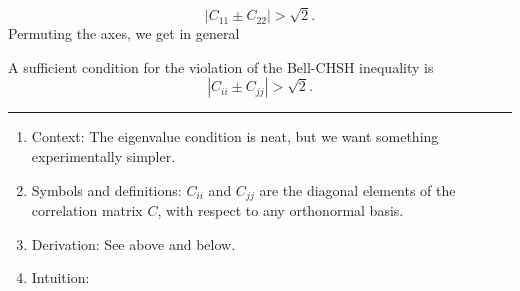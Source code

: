 \[
\left|C_{1 1} \pm C_{2 2}\right|>\sqrt{2}.
\]
Permuting the axes, we get in general
\begin{tcolorbox}[breakable,colback=cyan!10,title=Bell Inequality Violation]
    A sufficient condition for the violation of the Bell-CHSH inequality is
\begin{equation}
    \label{eq:bell-violation-CiiCjj}
    \left|C_{i i} \pm C_{j j}\right|>\sqrt{2}.
\end{equation}
    \rule{\linewidth}{0.1em}
    \begin{enumerate}[leftmargin=!,labelindent=!,itemindent=-15pt]
        \item Context: The eigenvalue condition is neat, but we want something experimentally simpler.
        \item Symbols and definitions: $C_{ii}$ and $C_{jj}$ are the diagonal elements of the correlation matrix $C$, with respect to any orthonormal basis.
        \item Derivation: See above and below.
        \item Intuition: 
    \end{enumerate}
\end{tcolorbox}

